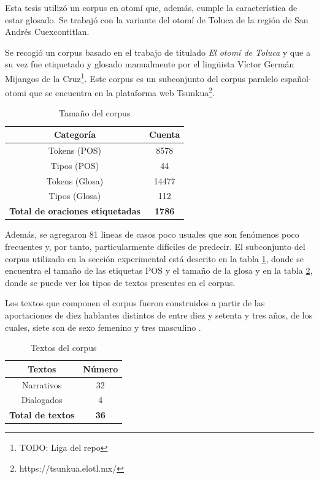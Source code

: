 \documentclass[letterpaper,12pt,oneside]{book}
\theoremstyle{definition}
\begin{document}
Esta  tesis utilizó un corpus en otomí que, además, cumple la característica de estar glosado. Se trabajó con la variante del otomí de Toluca de la región de San Andrés Cuexcontitlan.

Se recogió un corpus basado en el trabajo de \citet{lastra1992otomi} titulado \emph{El otomí de Toluca} y que a su vez fue etiquetado y glosado manualmente por el lingüista Víctor Germán Mijangos de la Cruz\footnote{TODO: Liga del repo}. Este corpus es un subconjunto del corpus paralelo español-otomi que se encuentra en la plataforma web Tsunkua\footnote{https://tsunkua.elotl.mx/}.


\begin{table}
	\centering
	\begin{tabular}{| c | c |}\hline
		\textbf{Categoría} & \textbf{Cuenta} \\ \hline
		Tokens (POS) & 8578\\
		Tipos (POS) & 44\\
		Tokens (Glosa) & 14477\\
		Tipos (Glosa) & 112\\
		\textbf{Total de oraciones etiquetadas} & \textbf{1786} \\ \hline
	\end{tabular}
	\caption{Tamaño del corpus}
	\label{table:corpus_length:1}
\end{table}

Además, se agregaron 81 lineas de casos poco usuales que son fenómenos poco frecuentes y, por tanto, particularmente difíciles de predecir. El subconjunto del corpus utilizado en la sección experimental está descrito en la tabla \ref{table:corpus_length:1}, donde se encuentra el tamaño de las etiquetas POS y el tamaño de la glosa y en la tabla \ref{table:corpus_text:1}, donde se puede ver los tipos de textos presentes en el corpus.

Los textos que componen el corpus fueron construidos a partir de las aportaciones de diez hablantes distintos de entre diez y setenta y tres años, de los cuales, siete son de sexo femenino y tres masculino \citep{lastra1992otomi}.

\begin{table}
	\centering
	\begin{tabular}{| c | c |}\hline
		\textbf{Textos} & \textbf{Número} \\ \hline
		Narrativos & 32 \\
		Dialogados & 4  \\
		\textbf{Total de textos}  & \textbf{36} \\\hline
	\end{tabular}
	\caption{Textos del corpus}
	\label{table:corpus_text:1}
\end{table}
\end{document}
